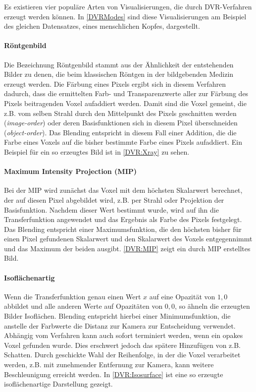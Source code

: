 \documentclass[a4paper,fontsize=12pt,toc=bib,parskip=half,ngerman]{scrartcl}
\begin{document}
Es existieren vier popul\"are Arten von Visualisierungen, die durch DVR-Verfahren erzeugt werden k\"onnen. In \cref{DVRModes} sind diese Visualisierungen am Beispiel des gleichen Datensatzes, eines menschlichen Kopfes, dargestellt.

\paragraph{R\"ontgenbild}
Die Bezeichnung \glq R\"ontgenbild\grq{} stammt aus der \"Ahnlichkeit der entstehenden Bilder zu denen, die beim klassischen R\"ontgen in der bildgebenden Medizin erzeugt werden. Die F\"arbung eines Pixels ergibt sich in diesem Verfahren dadurch, dass die ermittelten Farb- und Transparenzwerte aller zur F\"arbung des Pixels beitragenden Voxel aufaddiert werden. Damit sind die Voxel gemeint, die z.B. vom selben Strahl durch den Mittelpunkt des Pixels geschnitten werden (\textit{image-order}) oder deren Basisfunktionen sich in diesem Pixel \"uberschneiden (\textit{object-order}). Das Blending entspricht in diesem Fall einer Addition, die die Farbe eines Voxels auf die bisher bestimmte Farbe eines Pixels aufaddiert. Ein Beispiel f\"ur ein so erzeugtes Bild ist in \cref{DVR:Xray} zu sehen. 

\paragraph{Maximum Intensity Projection (MIP)}
Bei der MIP wird zun\"achst das Voxel mit dem h\"ochsten Skalarwert berechnet, der auf diesen Pixel abgebildet wird, z.B. per Strahl oder Projektion der Basisfunktion. Nachdem dieser Wert bestimmt wurde, wird auf ihn die Transferfunktion angewendet und das Ergebnis als Farbe des Pixels festgelegt. Das Blending entspricht einer Maximumsfunktion, die den h\"ochsten bisher f\"ur einen Pixel gefundenen Skalarwert und den Skalarwert des Voxels entgegennimmt und das Maximum der beiden ausgibt. \cref{DVR:MIP} zeigt ein durch MIP erstelltes Bild. 


\paragraph{Isofl\"achenartig}
Wenn die Transferfunktion genau einen Wert $x$ auf eine Opazit\"at von $1,0$ abbildet und alle anderen Werte auf Opazit\"aten von $0,0$, so \"ahneln die erzeugten Bilder Isofl\"achen. Blending entspricht hierbei einer Minimumsfunktion, die anstelle der Farbwerte die Distanz zur Kamera zur Entscheidung verwendet. Abh\"angig vom Verfahren kann auch sofort terminiert werden, wenn ein opakes Voxel gefunden wurde. Dies erschwert jedoch das sp\"atere Hinzuf\"ugen von z.B. Schatten. Durch geschickte Wahl der Reihenfolge, in der die Voxel verarbeitet werden, z.B. mit zunehmender Entfernung zur Kamera, kann weitere Beschleunigung erreicht werden. In \cref{DVR:Isosurface} ist eine so erzeugte isofl\"achenartige Darstellung gezeigt.
\end{document}
